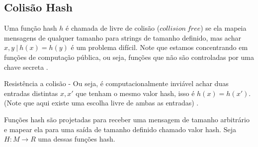 \documentclass[12pt]{article}
\begin{document}
\subsection{Colisão Hash}

Uma função hash \(h\) é chamada de livre de colisão (\(collision\ free\)) se ela mapeia mensagens
de qualquer tamanho para strings de tamanho definido, mas achar \(x, y\ |\ h(x) = h(y)\) é um
problema difícil. Note que estamos concentrando em funções de computação pública, ou seja, funções
que não são controladas por uma chave secreta \cite{damgaard1989design}.

Resistência a colisão - Ou seja, é computacionalmente inviável achar duas entradas distintas \(x, x'\)
que tenham o mesmo valor hash, isso é \(h(x) = h(x')\). (Note que aqui existe uma escolha livre de 
ambas as entradas) \cite{menezes1996handbook}.





Funções hash são projetadas para receber uma mensagem de tamanho arbitrário e mapear ela para uma 
saída de tamanho definido chamado valor hash. Seja \(H : M \to R\) uma dessas funções hash. 

\end{document}
